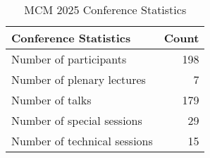 \begin{table}[h]
\centering
\begin{tabular}{|l|r|}
\hline
\textbf{Conference Statistics} & \textbf{Count} \\
\hline
Number of participants & 198 \\
\hline
Number of plenary lectures & 7 \\
\hline
Number of talks & 179 \\
\hline
Number of special sessions & 29 \\
\hline
Number of technical sessions & 15 \\
\hline
\end{tabular}
\caption{MCM 2025 Conference Statistics}
\label{tab:conference_stats}
\end{table}
